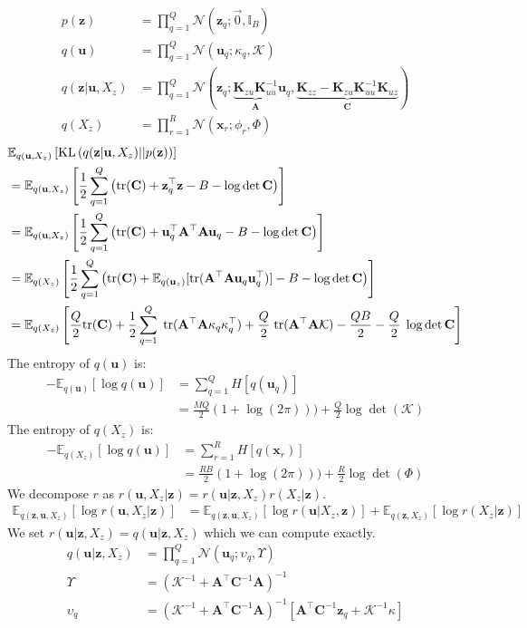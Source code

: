 \documentclass[12pt]{article}
\newcommand{\Kappa}{\mathcal{K}}
\newcommand{\xb}{\mathbf{x}}
\newcommand{\ub}{\mathbf{u}}
\newcommand{\zb}{\mathbf{z}}
\newcommand{\Cb}{\mathbf{C}}
\newcommand{\Ab}{\mathbf{A}}
\newcommand{\Kzz}{\mathbf{K}_{zz}}
\newcommand{\Kuu}{\mathbf{K}_{uu}}
\newcommand{\Kuz}{\mathbf{K}_{uz}}
\newcommand{\Kzu}{\mathbf{K}_{zu}}
\newcommand{\Ex}{\mathbb{E}}
\newcommand{\KL}{\mathrm{KL}}
\newcommand{\tr}{\mathrm{tr}}
\begin{document}
\begin{align}
p(\zb) &= \prod_{q=1}^Q \mathcal{N}(\zb_q; \vec{0}, \mathbb{I}_B) \\
q(\ub) &= \prod_{q=1}^Q \mathcal{N}(\ub_q; \kappa_q, \Kappa) \\
q(\zb|\ub,X_z) &= \prod_{q=1}^Q \mathcal{N}(\zb_q; \underbrace{\Kzu\Kuu^{-1}}_{\Ab}\ub_q, \underbrace{\Kzz-\Kzu\Kuu^{-1}\Kuz}_{\Cb}) \\
q(X_z) &= \prod_{r=1}^R \mathcal{N}(\xb_r; \phi_r, \Phi)
\end{align}
%
\begin{align}
&\Ex_{q(\ub,X_z)}\left[\KL\left(q(\zb|\ub,X_z)||p(\zb)\right)\right] \notag \\
&= \Ex_{q(\ub,X_z)}\left[\frac{1}{2}\sum_{q=1}^Q \left(\tr(\Cb) + \zb_q^\top\zb - B -  \log\det\Cb \right)\right] \\
&= \Ex_{q(\ub,X_z)}\left[\frac{1}{2}\sum_{q=1}^Q \left(\tr(\Cb) + \ub_q^\top\Ab^\top\Ab\ub_q - B -  \log\det\Cb \right)\right] \\
&=\Ex_{q(X_z)}\left[\frac{1}{2}\sum_{q=1}^Q \left(\tr(\Cb) + \Ex_{q(\ub_z)}[\tr(\Ab^\top\Ab\ub_q\ub_q^\top)] - B -  \log\det\Cb \right)\right] \\
&=\Ex_{q(X_z)}\left[\frac{Q}{2}\tr(\Cb) + \frac{1}{2}\sum_{q=1}^Q\;\tr(\Ab^\top\Ab\kappa_q\kappa_q^\top) + \frac{Q}{2}\;\tr(\Ab^\top\Ab\Kappa) - \frac{QB}{2} -  \frac{Q}{2}\;\log\det\Cb \right]
\end{align}
%
The entropy of $q(\ub)$ is:
%
\begin{align}
-\Ex_{q(\ub)}\left[\log q(\ub)\right] &= \sum_{q=1}^Q H[q(\ub_q)] \\
&= \frac{MQ}{2}(1+\log(2\pi))) + \frac{Q}{2}\log\det(\Kappa)
\end{align}
%
The entropy of $q(X_z)$ is:
%
\begin{align}
-\Ex_{q(X_z)}\left[\log q(\ub)\right] &= \sum_{r=1}^R H[q(\xb_r)] \\
&= \frac{RB}{2}(1+\log(2\pi))) + \frac{R}{2}\log\det(\Phi)
\end{align}
%
We decompose $r$ as $r(\ub,X_z|\zb) = r(\ub|\zb,X_z)r(X_z|\zb)$. 
%
\begin{align}
\Ex_{q(\zb,\ub,X_z)}\left[\log r(\ub,X_z|\zb)\right] &= \Ex_{q(\zb,\ub,X_z)}\left[\log r(\ub|X_z,\zb)\right] + \Ex_{q(\zb,X_z)}\left[\log r(X_z|\zb)\right] 
\end{align}
%
We set $r(\ub|\zb,X_z) = q(\ub|\zb,X_z)$ which we can compute exactly.
%
\begin{align}
q(\ub|\zb,X_z) &= \prod_{q=1}^Q \mathcal{N}(\ub_q; \upsilon_q, \Upsilon) \\
\Upsilon &= (\Kappa^{-1} + \Ab^\top\Cb^{-1}\Ab)^{-1} \\
\upsilon_q &= (\Kappa^{-1} + \Ab^\top\Cb^{-1}\Ab)^{-1}[\Ab^\top \Cb^{-1}\zb_q + \Kappa^{-1}\kappa]
\end{align}
\end{document}
